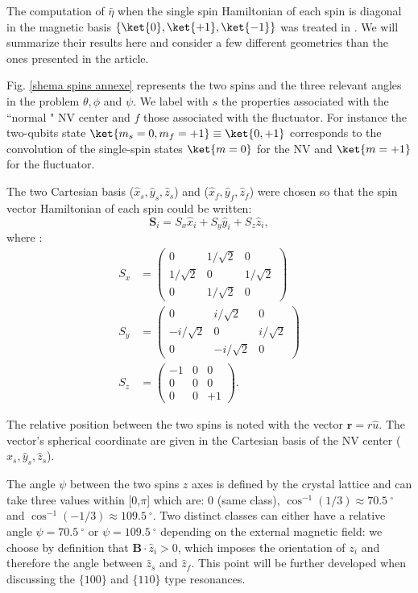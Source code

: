 \documentclass[a4paper, 11pt]{book}
\begin{document}
The computation of $\bar \eta$ when the single spin Hamiltonian of each spin is diagonal in the magnetic basis $\{ \ket{0}, \ket{+1}, \ket{-1}\}$ was treated in \citep{choi2017depolarization}. We will summarize their results here and consider a few different geometries than the ones presented in the article.

Fig. \ref{shema spins annexe} represents the two spins and the three relevant angles in the problem $\theta,\phi$ and $\psi$. We label with $s$ the properties associated with the ``normal " NV center and $f$ those associated with the fluctuator. For instance the two-qubits state $\ket{m_s=0,m_f=+1}\equiv\ket{0,+1}$ corresponds to the convolution of the single-spin states $\ket{m=0}$ for the NV and $\ket{m=+1}$ for the fluctuator.

The two Cartesian basis ($\hat x_s,\hat y_s,\hat z_s$) and ($\hat x_f,\hat y_f,\hat z_f$) were chosen so that the spin vector Hamiltonian of each spin could be written:
\begin{equation}
\mathbf{S}_i=S_x \hat x_i + S_y \hat{y}_i + S_z \hat{z}_i,
\end{equation}
where :
\begin{align*}
S_x&=\begin{pmatrix}
0&1/\sqrt{2}&0 \\
1/\sqrt{2}&0&1/\sqrt{2} \\
0&1/\sqrt{2}&0
\end{pmatrix} \\
S_y&=\begin{pmatrix}
0&i/\sqrt{2}&0 \\
-i/\sqrt{2}&0&i/\sqrt{2} \\
0&-i/\sqrt{2}&0
\end{pmatrix} \\
S_z&=\begin{pmatrix}
-1&0&0 \\
0&0&0 \\
0&0&+1
\end{pmatrix}.
\end{align*}

The relative position between the two spins is noted with the vector $\mathbf{r}=r\hat{u}$. The vector's spherical coordinate are given in the Cartesian basis of the NV center ($\hat x_s,\hat y_s,\hat z_s$).

The angle $\psi$ between the two spins $z$ axes is defined by the crystal lattice and can take three values within [0,$\pi$] which are: 0 (same class), $\cos^{-1}(1/3) \approx 70.5\ ^\circ$ and $\cos^{-1}(-1/3) \approx 109.5\ ^\circ$. Two distinct classes can either have a relative angle $\psi=70.5 \ ^\circ$ or $\psi=109.5 \ ^\circ$ depending on the external magnetic field: we choose by definition that $\mathbf{B}\cdot\hat{z}_i >0$, which imposes the orientation of $z_i$ and therefore the angle between $\hat z_s$ and $\hat z_f$. This point will be further developed when discussing the $\{100\}$ and $\{110\}$ type resonances.
\end{document}
